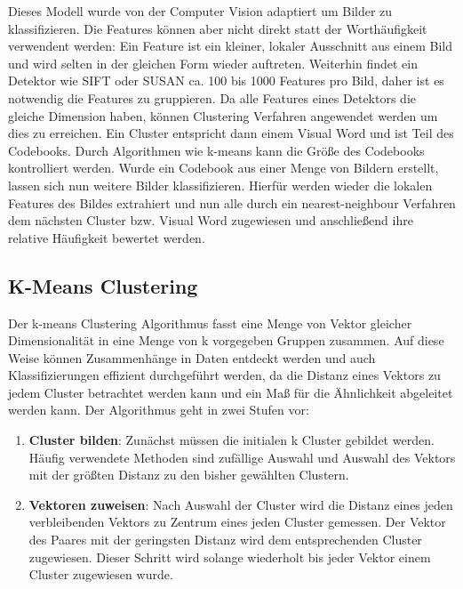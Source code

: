 Dieses Modell wurde von der Computer Vision adaptiert um Bilder zu klassifizieren. Die Features können aber nicht direkt statt der Worthäufigkeit verwendent werden: Ein Feature ist ein kleiner, lokaler Ausschnitt aus einem Bild und wird selten in der gleichen Form wieder auftreten. Weiterhin findet ein Detektor wie SIFT oder SUSAN ca. 100 bis 1000 Features pro Bild, daher ist es notwendig die Features zu gruppieren. Da alle Features eines Detektors die gleiche Dimension haben, können Clustering Verfahren angewendet werden um dies zu erreichen. Ein Cluster entspricht dann einem Visual Word und ist Teil des Codebooks. Durch Algorithmen wie k-means kann die Größe des Codebooks kontrolliert werden. Wurde ein Codebook aus einer Menge von Bildern erstellt, lassen sich nun weitere Bilder klassifizieren. Hierfür werden wieder die lokalen Features des Bildes extrahiert und nun alle durch ein nearest-neighbour Verfahren dem nächsten Cluster bzw. Visual Word zugewiesen und anschließend ihre relative Häufigkeit bewertet werden.

\subsection{K-Means Clustering}

Der k-means Clustering Algorithmus fasst eine Menge von Vektor gleicher Dimensionalität in eine Menge von k vorgegeben Gruppen zusammen. Auf diese Weise können Zusammenhänge in Daten entdeckt werden und auch Klassifizierungen effizient durchgeführt werden, da die Distanz eines Vektors zu jedem Cluster betrachtet werden kann und ein Maß für die Ähnlichkeit abgeleitet werden kann. Der Algorithmus geht in zwei Stufen vor:

\begin{enumerate}
	\item \textbf{Cluster bilden}: Zunächst müssen die initialen k Cluster gebildet werden. Häufig verwendete Methoden sind zufällige Auswahl und Auswahl des Vektors mit der größten Distanz zu den bisher gewählten Clustern.
	\item \textbf{Vektoren zuweisen}: Nach Auswahl der Cluster wird die Distanz eines jeden verbleibenden Vektors zu Zentrum eines jeden Cluster gemessen. Der Vektor des Paares mit der geringsten Distanz wird dem entsprechenden Cluster zugewiesen. Dieser Schritt wird solange wiederholt bis jeder Vektor einem Cluster zugewiesen wurde.
\end{enumerate}

